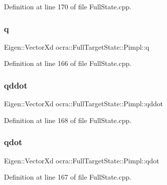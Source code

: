 Definition at line 170 of file Full\+State.\+cpp.

\hypertarget{structocra_1_1FullTargetState_1_1Pimpl_afb9abfe35480d2dea95ed9d54e8906df}{}\label{structocra_1_1FullTargetState_1_1Pimpl_afb9abfe35480d2dea95ed9d54e8906df} 
\subsubsection{\texorpdfstring{q}{q}}
{\footnotesize\ttfamily Eigen\+::\+Vector\+Xd ocra\+::\+Full\+Target\+State\+::\+Pimpl\+::q}



Definition at line 166 of file Full\+State.\+cpp.

\hypertarget{structocra_1_1FullTargetState_1_1Pimpl_a6eb86dcb00ed58935f11c42f030645a3}{}\label{structocra_1_1FullTargetState_1_1Pimpl_a6eb86dcb00ed58935f11c42f030645a3} 
\subsubsection{\texorpdfstring{qddot}{qddot}}
{\footnotesize\ttfamily Eigen\+::\+Vector\+Xd ocra\+::\+Full\+Target\+State\+::\+Pimpl\+::qddot}



Definition at line 168 of file Full\+State.\+cpp.

\hypertarget{structocra_1_1FullTargetState_1_1Pimpl_a2d1307a89fa37ddb50305785e7d91e68}{}\label{structocra_1_1FullTargetState_1_1Pimpl_a2d1307a89fa37ddb50305785e7d91e68} 
\subsubsection{\texorpdfstring{qdot}{qdot}}
{\footnotesize\ttfamily Eigen\+::\+Vector\+Xd ocra\+::\+Full\+Target\+State\+::\+Pimpl\+::qdot}



Definition at line 167 of file Full\+State.\+cpp.

